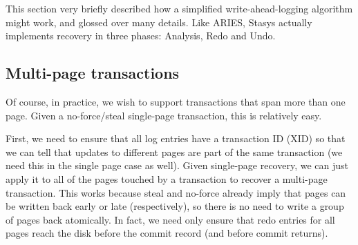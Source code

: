 \documentclass[letterpaper,twocolumn,10pt]{article}
\newcommand{\yad}{Stasys\xspace}
\newcommand{\eat}[1]{}
\begin{document}
This section very briefly described how a simplified
write-ahead-logging algorithm might work, and glossed over many
details.  Like ARIES, \yad actually implements recovery in three
phases: Analysis, Redo and Undo.  


\eat{
Note that recovery relies on the fact that it knows which version of
the page is recorded on disk, and that the page itself is
self-consistent.  If it passes an unknown version of a page into undo
(which is an arbitrary function), it has no way of predicting what
will happen.
}


\subsection{Multi-page transactions}

Of course, in practice, we wish to support transactions that span more
than one page.  Given a no-force/steal single-page transaction, this
is relatively easy.

First, we need to ensure that all log entries have a transaction ID
(XID) so that we can tell that updates to different pages are part of
the same transaction (we need this in the single page case as well).
  Given single-page recovery, we can just apply it to
all of the pages touched by a transaction to recover a multi-page
transaction.  This works because steal and no-force already imply
that pages can be written back early or late (respectively), so there
is no need to write a group of pages back atomically.  In fact, we
need only ensure that redo entries for all pages reach the disk before
the commit record (and before commit returns).
\end{document}

